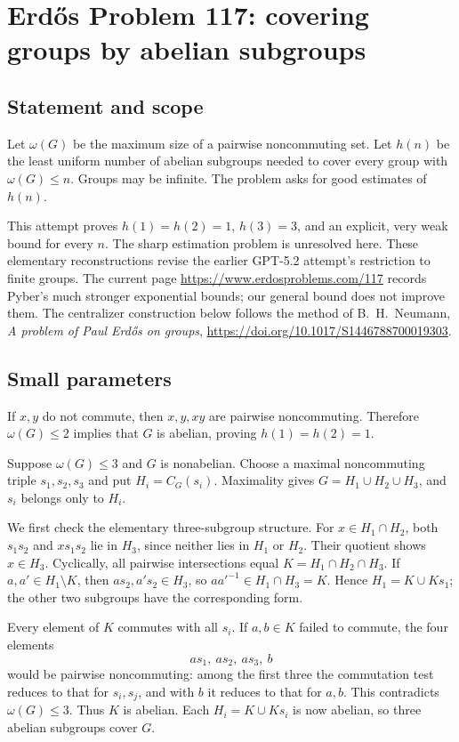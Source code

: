\section*{Erd\H{o}s Problem 117: covering groups by abelian subgroups}
\subsection*{Statement and scope}
Let $\omega(G)$ be the maximum size of a pairwise noncommuting set. Let $h(n)$ be the least uniform number of abelian subgroups needed to cover every group with $\omega(G)\le n$. Groups may be infinite. The problem asks for good estimates of $h(n)$.

This attempt proves $h(1)=h(2)=1$, $h(3)=3$, and an explicit, very weak bound for every $n$. The sharp estimation problem is unresolved here. These elementary reconstructions revise the earlier GPT-5.2 attempt's restriction to finite groups. The current page \url{https://www.erdosproblems.com/117} records Pyber's much stronger exponential bounds; our general bound does not improve them. The centralizer construction below follows the method of B.\ H.\ Neumann, \emph{A problem of Paul Erd\H{o}s on groups}, \url{https://doi.org/10.1017/S1446788700019303}.

\subsection*{Small parameters}
If $x,y$ do not commute, then $x,y,xy$ are pairwise noncommuting. Therefore $\omega(G)\le2$ implies that $G$ is abelian, proving $h(1)=h(2)=1$.

Suppose $\omega(G)\le3$ and $G$ is nonabelian. Choose a maximal noncommuting triple $s_1,s_2,s_3$ and put $H_i=C_G(s_i)$. Maximality gives $G=H_1\cup H_2\cup H_3$, and $s_i$ belongs only to $H_i$.

We first check the elementary three-subgroup structure. For $x\in H_1\cap H_2$, both $s_1s_2$ and $xs_1s_2$ lie in $H_3$, since neither lies in $H_1$ or $H_2$. Their quotient shows $x\in H_3$. Cyclically, all pairwise intersections equal $K=H_1\cap H_2\cap H_3$. If $a,a'\in H_1\setminus K$, then $as_2,a's_2\in H_3$, so $aa'^{-1}\in H_1\cap H_3=K$. Hence $H_1=K\cup Ks_1$; the other two subgroups have the corresponding form.

Every element of $K$ commutes with all $s_i$. If $a,b\in K$ failed to commute, the four elements
\[
 as_1,\ as_2,\ as_3,\ b
\]
would be pairwise noncommuting: among the first three the commutation test reduces to that for $s_i,s_j$, and with $b$ it reduces to that for $a,b$. This contradicts $\omega(G)\le3$. Thus $K$ is abelian. Each $H_i=K\cup Ks_i$ is now abelian, so three abelian subgroups cover $G$.

